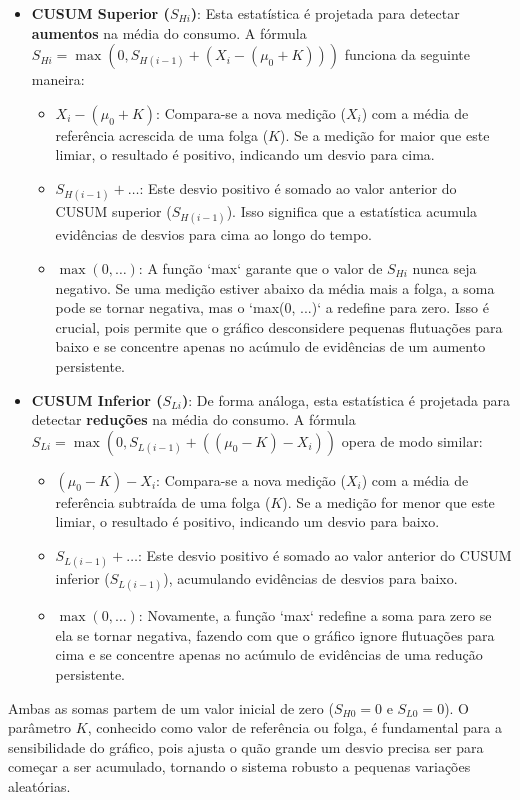 \begin{itemize}
    \begin{itemize}
        \item \textbf{CUSUM Superior ($S_{Hi}$)}: Esta estatística é projetada para detectar \textbf{aumentos} na média do consumo. A fórmula $S_{Hi} = \max(0, S_{H(i-1)} + (X_i - (\mu_0 + K)))$ funciona da seguinte maneira:
        \begin{itemize}
            \item $X_i - (\mu_0 + K)$: Compara-se a nova medição ($X_i$) com a média de referência acrescida de uma folga ($K$). Se a medição for maior que este limiar, o resultado é positivo, indicando um desvio para cima.
            \item $S_{H(i-1)} + \dots$: Este desvio positivo é somado ao valor anterior do CUSUM superior ($S_{H(i-1)}$). Isso significa que a estatística acumula evidências de desvios para cima ao longo do tempo.
            \item $\max(0, \dots)$: A função `max` garante que o valor de $S_{Hi}$ nunca seja negativo. Se uma medição estiver abaixo da média mais a folga, a soma pode se tornar negativa, mas o `max(0, ...)` a redefine para zero. Isso é crucial, pois permite que o gráfico desconsidere pequenas flutuações para baixo e se concentre apenas no acúmulo de evidências de um aumento persistente.
        \end{itemize}

        \item \textbf{CUSUM Inferior ($S_{Li}$)}: De forma análoga, esta estatística é projetada para detectar \textbf{reduções} na média do consumo. A fórmula $S_{Li} = \max(0, S_{L(i-1)} + ((\mu_0 - K) - X_i))$ opera de modo similar:
        \begin{itemize}
            \item $(\mu_0 - K) - X_i$: Compara-se a nova medição ($X_i$) com a média de referência subtraída de uma folga ($K$). Se a medição for menor que este limiar, o resultado é positivo, indicando um desvio para baixo.
            \item $S_{L(i-1)} + \dots$: Este desvio positivo é somado ao valor anterior do CUSUM inferior ($S_{L(i-1)}$), acumulando evidências de desvios para baixo.
            \item $\max(0, \dots)$: Novamente, a função `max` redefine a soma para zero se ela se tornar negativa, fazendo com que o gráfico ignore flutuações para cima e se concentre apenas no acúmulo de evidências de uma redução persistente.
        \end{itemize}
    \end{itemize}
    Ambas as somas partem de um valor inicial de zero ($S_{H0} = 0$ e $S_{L0} = 0$). O parâmetro $K$, conhecido como valor de referência ou folga, é fundamental para a sensibilidade do gráfico, pois ajusta o quão grande um desvio precisa ser para começar a ser acumulado, tornando o sistema robusto a pequenas variações aleatórias.


\end{itemize}
